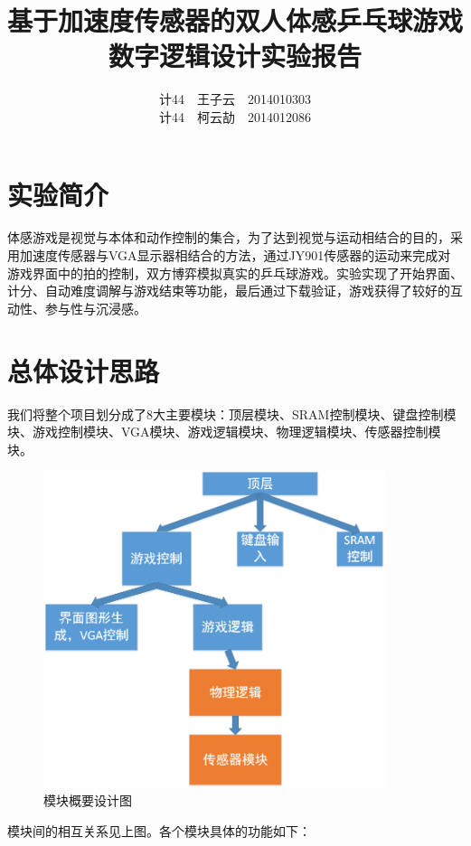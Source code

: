 \documentclass[UTF8]{article}
\title{基于加速度传感器的双人体感乒乓球游戏\\
数字逻辑设计实验报告}
\author{计44~~王子云~~2014010303\\
计44~~柯云劼~~2014012086
}
\date{ }
\begin{document}
\maketitle
\newpage
\tableofcontents
\newpage
\section{实验简介}
体感游戏是视觉与本体和动作控制的集合，为了达到视觉与运动相结合的目的，采用加速度传感器与VGA显示器相结合的方法，通过JY901传感器的运动来完成对游戏界面中的拍的控制，双方博弈模拟真实的乒乓球游戏。实验实现了开始界面、计分、自动难度调解与游戏结束等功能，最后通过下载验证，游戏获得了较好的互动性、参与性与沉浸感。
\section{总体设计思路}
我们将整个项目划分成了8大主要模块：顶层模块、SRAM控制模块、键盘控制模块、游戏控制模块、VGA模块、游戏逻辑模块、物理逻辑模块、传感器控制模块。
\begin{figure}[H]
  \centering
  \includegraphics[width=10cm]{1-1.png}
  \caption{模块概要设计图}
\end{figure}
模块间的相互关系见上图。各个模块具体的功能如下：
\end{document}
